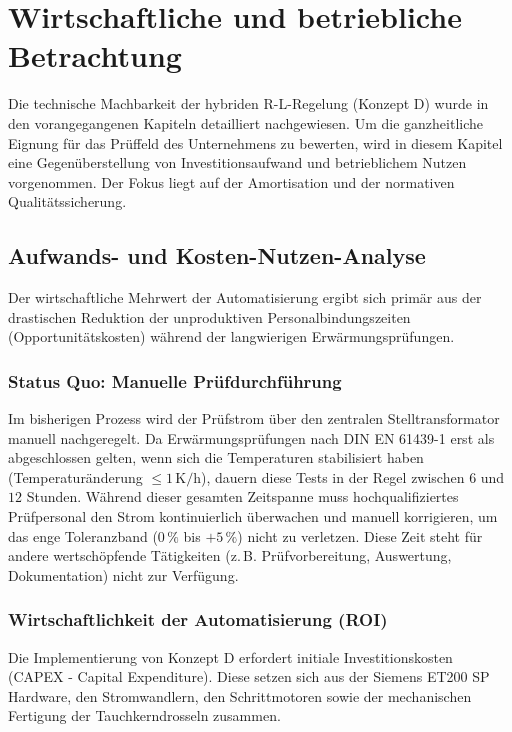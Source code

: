 
\section{Wirtschaftliche und betriebliche Betrachtung}
\label{chap:wirtschaftlichkeit}

Die technische Machbarkeit der hybriden R-L-Regelung (Konzept D) wurde in den vorangegangenen Kapiteln detailliert nachgewiesen. Um die ganzheitliche Eignung für das Prüffeld des Unternehmens zu bewerten, wird in diesem Kapitel eine Gegenüberstellung von Investitionsaufwand und betrieblichem Nutzen vorgenommen. Der Fokus liegt auf der Amortisation und der normativen Qualitätssicherung.

\subsection{Aufwands- und Kosten-Nutzen-Analyse}
\label{sec:kosten_nutzen}

Der wirtschaftliche Mehrwert der Automatisierung ergibt sich primär aus der drastischen Reduktion der unproduktiven Personalbindungszeiten (Opportunitätskosten) während der langwierigen Erwärmungsprüfungen.

\subsubsection{Status Quo: Manuelle Prüfdurchführung}
Im bisherigen Prozess wird der Prüfstrom über den zentralen Stelltransformator manuell nachgeregelt. Da Erwärmungsprüfungen nach DIN EN 61439-1 erst als abgeschlossen gelten, wenn sich die Temperaturen stabilisiert haben (Temperaturänderung $\le 1\,\text{K/h}$), dauern diese Tests in der Regel zwischen $6$ und $12$ Stunden. Während dieser gesamten Zeitspanne muss hochqualifiziertes Prüfpersonal den Strom kontinuierlich überwachen und manuell korrigieren, um das enge Toleranzband ($0\,\%$ bis $+5\,\%$) nicht zu verletzen. Diese Zeit steht für andere wertschöpfende Tätigkeiten (z.\,B. Prüfvorbereitung, Auswertung, Dokumentation) nicht zur Verfügung.

\subsubsection{Wirtschaftlichkeit der Automatisierung (ROI)}
Die Implementierung von Konzept D erfordert initiale Investitionskosten (CAPEX - Capital Expenditure). Diese setzen sich aus der Siemens ET200 SP Hardware, den Stromwandlern, den Schrittmotoren sowie der mechanischen Fertigung der Tauchkerndrosseln zusammen.

